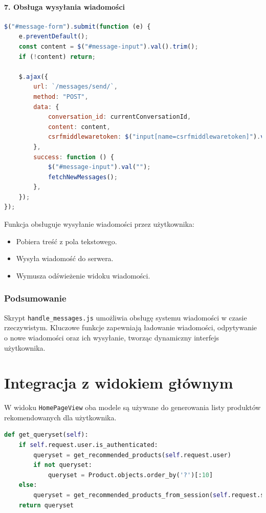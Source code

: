 \documentclass[12pt,a4paper,oneside]{article}
\theoremstyle{definition}
\numberwithin{equation}{section}
\begin{document}
\paragraph{7. Obsługa wysyłania wiadomości}
\begin{lstlisting}[language=JavaScript, caption=Wysyłanie wiadomości]
$("#message-form").submit(function (e) {
    e.preventDefault();
    const content = $("#message-input").val().trim();
    if (!content) return;

    $.ajax({
        url: `/messages/send/`,
        method: "POST",
        data: {
            conversation_id: currentConversationId,
            content: content,
            csrfmiddlewaretoken: $("input[name=csrfmiddlewaretoken]").val(),
        },
        success: function () {
            $("#message-input").val("");
            fetchNewMessages();
        },
    });
});
\end{lstlisting}
Funkcja obsługuje wysyłanie wiadomości przez użytkownika:
\begin{itemize}
    \item Pobiera treść z pola tekstowego.
    \item Wysyła wiadomość do serwera.
    \item Wymusza odświeżenie widoku wiadomości.
\end{itemize}



\subsubsection{Podsumowanie}
Skrypt \texttt{handle\_messages.js} umożliwia obsługę systemu wiadomości w 
czasie rzeczywistym. Kluczowe funkcje zapewniają ładowanie wiadomości, odpytywanie o nowe wiadomości oraz ich wysyłanie, tworząc dynamiczny interfejs użytkownika.



\section{Integracja z widokiem głównym}
W widoku \texttt{HomePageView} oba modele są używane do generowania listy produktów rekomendowanych dla użytkownika.

\begin{lstlisting}[language=Python]
def get_queryset(self):
    if self.request.user.is_authenticated:
        queryset = get_recommended_products(self.request.user)
        if not queryset:
            queryset = Product.objects.order_by('?')[:10]
    else:
        queryset = get_recommended_products_from_session(self.request.session)
    return queryset
\end{lstlisting}
\end{document}
